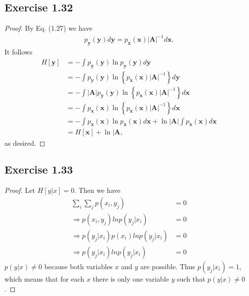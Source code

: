 \documentclass[11pt]{article}
\theoremstyle{definition}
\begin{document}
\subsection{Exercise 1.32}
\begin{proof}
By Eq. (1.27) we have
\begin{align*}
p_{\textbf{y}}(\textbf{y})d\textbf{y}  = p_{\textbf{x}}(\textbf{x})|\textbf{A}|^{-1}d\textbf{x}.
\end{align*}
It follows
\begin{align*}
H[\textbf{y}] &= -\int p_{\textbf{y}}(\textbf{y})\ln p_{\textbf{y}}(\textbf{y})d\textbf{y} \\
&= -\int p_{\textbf{y}}(\textbf{y})\ln\left\{p_{\textbf{x}}(\textbf{x})|\textbf{A}|^{-1}\right\} d\textbf{y} \\
&= -\int |\textbf{A}|p_{\textbf{y}}(\textbf{y})\ln\left\{p_{\textbf{x}}(\textbf{x})|\textbf{A}|^{-1}\right\} d\textbf{x} \\
&= -\int p_{\textbf{x}}(\textbf{x})\ln\left\{p_{\textbf{x}}(\textbf{x})|\textbf{A}|^{-1}\right\} d\textbf{x} \\
&= -\int p_{\textbf{x}}(\textbf{x})\ln p_{\textbf{x}}(\textbf{x})d\textbf{x} + \ln|\textbf{A}|\int p_{\textbf{x}}(\textbf{x})d\textbf{x} \\
&= H[\textbf{x}] + \ln|\textbf{A},
\end{align*}
as desired.
\end{proof}

\subsection{Exercise 1.33}
\begin{proof}
Let $H[y|x] = 0$. Then we have
\begin{align*}
\sum_i\sum_jp(x_i,y_j) &= 0 \\
\Rightarrow p(x_i,y_j)lnp(y_j|x_i) &= 0\\
\Rightarrow p(y_j|x_i)p(x_i)lnp(y_j|x_i) &= 0\\
\Rightarrow p(y_j|x_i)lnp(y_j|x_i) &= 0
\end{align*}
$p(y|x) \not = 0$ because both variables $x$ and $y$ are possible. Thus $p(y_j|x_i) = 1$, which means that for each $x$ there is only one variable $y$ such that $p(y|x) \not = 0$.
\end{proof}
\end{document}
